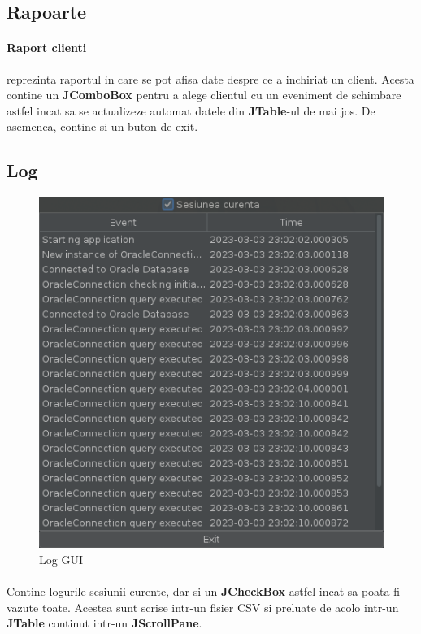 \documentclass[oneside]{article}
\begin{document}
\subsection[Rapoarte]{Rapoarte}
\paragraph{Raport clienti} reprezinta raportul in care se pot afisa date despre ce a inchiriat un client. Acesta contine un \textbf{JComboBox} pentru a alege clientul cu un eveniment de schimbare astfel incat sa se actualizeze automat datele din \textbf{JTable}-ul de mai jos. De asemenea, contine si un buton de exit.


\subsection[Log]{Log}
\begin{figure}[ht]
    \centering
    \noindent\includegraphics[scale=0.6]{loggui.png}
    \caption{Log GUI}
    \label{fig:loggui}
\end{figure}
\paragraph{} Contine logurile sesiunii curente, dar si un \textbf{JCheckBox} astfel incat sa poata fi vazute toate. Acestea sunt scrise intr-un fisier CSV si preluate de acolo intr-un \textbf{JTable} continut intr-un \textbf{JScrollPane}.
\end{document}
